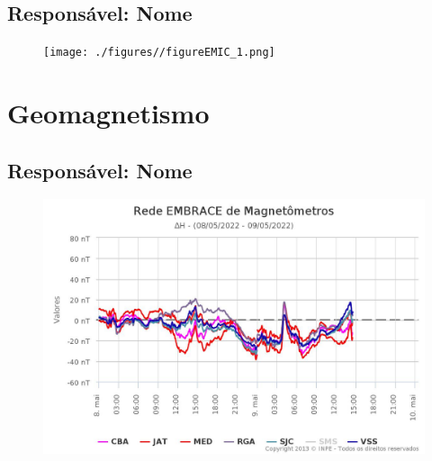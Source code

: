 \documentclass[a4paper, 10pt]{article}
\begin{document}
 \subsection{Responsável: Nome} 
 
\begin{figure}[H]
    
                        \centering
   
                             \texttt{[image: ./figures//figureEMIC\_1.png]}

                        \end{figure}

                     \section{Geomagnetismo} 
 \subsection{Responsável: Nome} 
 
\begin{figure}[H]
    
                        \centering
   
                             \includegraphics[width=14cm]{./figures//figureGeomag_0.png}

                        \end{figure}
\end{document}
